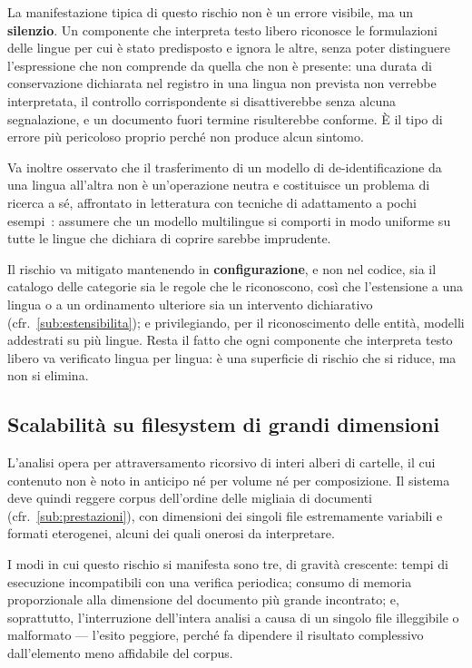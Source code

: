 La manifestazione tipica di questo rischio non è un errore visibile, ma un \textbf{silenzio}. Un componente che interpreta testo libero riconosce le formulazioni delle lingue per cui è stato predisposto e ignora le altre, senza poter distinguere l'espressione che non comprende da quella che non è presente: una durata di conservazione dichiarata nel registro in una lingua non prevista non verrebbe interpretata, il controllo corrispondente si disattiverebbe senza alcuna segnalazione, e un documento fuori termine risulterebbe conforme. È il tipo di errore più pericoloso proprio perché non produce alcun sintomo. \medskip

Va inoltre osservato che il trasferimento di un modello di de-identificazione da una lingua all'altra non è un'operazione neutra e costituisce un problema di ricerca a sé, affrontato in letteratura con tecniche di adattamento a pochi esempi~\cite{aminFewShotCrosslingualTransfer2022}: assumere che un modello multilingue si comporti in modo uniforme su tutte le lingue che dichiara di coprire sarebbe imprudente. \medskip

Il rischio va mitigato mantenendo in \textbf{configurazione}, e non nel codice, sia il catalogo delle categorie sia le regole che le riconoscono, così che l'estensione a una lingua o a un ordinamento ulteriore sia un intervento dichiarativo (cfr.~\ref{sub:estensibilita}); e privilegiando, per il riconoscimento delle entità, modelli addestrati su più lingue. Resta il fatto che ogni componente che interpreta testo libero va verificato lingua per lingua: è una superficie di rischio che si riduce, ma non si elimina.

\subsection{Scalabilità su filesystem di grandi dimensioni}
\label{sub:rischio-scalabilita}
L'analisi opera per attraversamento ricorsivo di interi alberi di cartelle, il cui contenuto non è noto in anticipo né per volume né per composizione. Il sistema deve quindi reggere corpus dell'ordine delle migliaia di documenti (cfr.~\ref{sub:prestazioni}), con dimensioni dei singoli file estremamente variabili e formati eterogenei, alcuni dei quali onerosi da interpretare. \medskip

I modi in cui questo rischio si manifesta sono tre, di gravità crescente: tempi di esecuzione incompatibili con una verifica periodica; consumo di memoria proporzionale alla dimensione del documento più grande incontrato; e, soprattutto, l'interruzione dell'intera analisi a causa di un singolo file illeggibile o malformato --- l'esito peggiore, perché fa dipendere il risultato complessivo dall'elemento meno affidabile del corpus. \medskip

